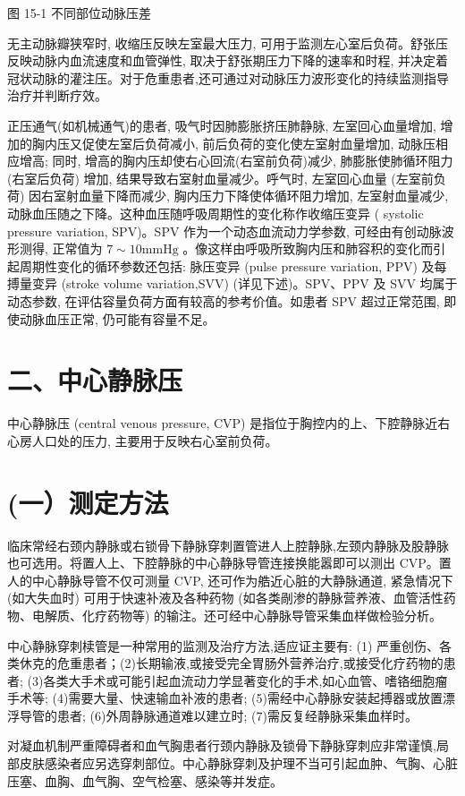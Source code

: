 \documentclass[10pt]{article}
\begin{document}
图 15-1 不同部位动脉压差

无主动脉瓣狭窄时, 收缩压反映左室最大压力, 可用于监测左心室后负荷。舒张压反映动脉内血流速度和血管弹性, 取决于舒张期压力下降的速率和时程, 并决定着冠状动脉的灌注压。对于危重患者,还可通过对动脉压力波形变化的持续监测指导治疗并判断疗效。

正压通气(如机械通气)的患者, 吸气时因肺膨胀挤压肺静脉, 左室回心血量增加, 增加的胸内压又促使左室后负荷减小, 前后负荷的变化使左室射血量增加, 动脉压相应增高; 同时, 增高的胸内压却使右心回流(右室前负荷)减少, 肺膨胀使肺循环阻力 (右室后负荷) 增加, 结果导致右室射血量减少。呼气时, 左室回心血量 (左室前负荷) 因右室射血量下降而减少, 胸内压力下降使体循环阻力增加, 左室射血量减少, 动脉血压随之下降。这种血压随呼吸周期性的变化称作收缩压变异 ( systolic pressure variation, SPV)。SPV 作为一个动态血流动力学参数, 可经由有创动脉波形测得, 正常值为 $7 \sim 10 \mathrm{mmHg}$ 。像这样由呼吸所致胸内压和肺容积的变化而引起周期性变化的循环参数还包括: 脉压变异 (pulse pressure variation, PPV) 及每搏量变异 (stroke volume variation,SVV) (详见下述)。SPV、PPV 及 SVV 均属于动态参数, 在评估容量负荷方面有较高的参考价值。如患者 SPV 超过正常范围, 即使动脉血压正常, 仍可能有容量不足。

\section*{二、中心静脉压}
中心静脉压 (central venous pressure, CVP) 是指位于胸控内的上、下腔静脉近右心房人口处的压力, 主要用于反映右心室前负荷。

\section*{(一）测定方法}
临床常经右颈内静脉或右锁骨下静脉穿刺置管进人上腔静脉,左颈内静脉及股静脉也可选用。将置人上、下腔静脉的中心静脉导管连接换能嚣即可以测出 CVP。置人的中心静脉导管不仅可测量 CVP, 还可作为艁近心脏的大静脉通道, 紧急情况下 (如大失血时) 可用于快速补液及各种药物 (如各类剮渗的静脉营养液、血管活性药物、电解质、化疗药物等) 的输注。还可经中心静脉导管采集血样做检验分析。

中心静脉穿刺椟管是一种常用的监测及治疗方法,适应证主要有: (1) 严重创伤、各类休克的危重患者；(2)长期输液,或接受完全胃肠外营养治疗,或接受化疗药物的患者; (3)各类大手术或可能引起血流动力学显著变化的手术,如心血管、嗜铬细胞瘤手术等; (4)需要大量、快速输血补液的患者; (5)需经中心静脉安装起搏器或放置漂浮导管的患者; (6)外周静脉通道难以建立时; (7)需反复经静脉采集血样时。

对凝血机制严重障碍者和血气胸患者行颈内静脉及锁骨下静脉穿刺应非常谨慎,局部皮肤感染者应另选穿刺部位。中心静脉穿刺及护理不当可引起血肿、气胸、心脏压塞、血胸、血气胸、空气检塞、感染等并发症。
\end{document}
